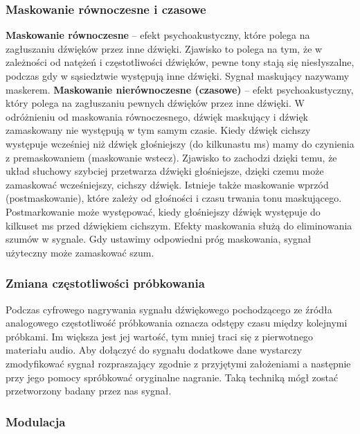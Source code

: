 \documentclass[a4paper,titleauthor]{mwart}
\begin{document}
	
	\subsubsection{Maskowanie równoczesne i czasowe}
	
	\textbf{Maskowanie równoczesne} – efekt psychoakustyczny, które polega na zagłuszaniu dźwięków przez inne dźwięki. Zjawisko to polega na tym, że w zależności od natężeń i częstotliwości dźwięków, pewne tony stają się niesłyszalne, podczas gdy w sąsiedztwie występują inne dźwięki. Sygnał maskujący nazywamy maskerem. \newline \newline
	\textbf{Maskowanie nierównoczesne (czasowe)} – efekt psychoakustyczny, który polega na zagłuszaniu pewnych dźwięków przez inne dźwięki. W odróżnieniu od maskowania równoczesnego, dźwięk maskujący i dźwięk zamaskowany nie występują w tym samym czasie. Kiedy dźwięk cichszy występuje wcześniej niż dźwięk głośniejszy (do kilkunastu ms) mamy do czynienia z premaskowaniem (maskowanie wstecz). Zjawisko to zachodzi dzięki temu, że układ słuchowy szybciej przetwarza dźwięki głośniejsze, dzięki czemu może zamaskować wcześniejszy, cichszy dźwięk. Istnieje także maskowanie wprzód (postmaskowanie), które zależy od głośności i czasu trwania tonu maskującego. Postmarkowanie może występować, kiedy głośniejszy dźwięk występuje do kilkuset ms przed dźwiękiem cichszym.
	\newline \newline
	Efekty maskowania służą do eliminowania szumów w sygnale. Gdy ustawimy odpowiedni próg maskowania, sygnał użyteczny może zamaskować szum.
	
	
	\subsubsection{Zmiana częstotliwości próbkowania}
	
	Podczas cyfrowego nagrywania sygnału dźwiękowego pochodzącego ze źródła analogowego częstotliwość próbkowania oznacza odstępy czasu między kolejnymi próbkami. Im większa jest jej wartość, tym mniej traci się z pierwotnego materiału audio. Aby dołączyć do sygnału dodatkowe dane wystarczy zmodyfikować sygnał rozpraszający zgodnie z przyjętymi założeniami a następnie przy jego pomocy spróbkować oryginalne nagranie. Taką techniką mógł zostać przetworzony badany przez nas sygnał. 
	
	\subsubsection{Modulacja}
	
\end{document}
